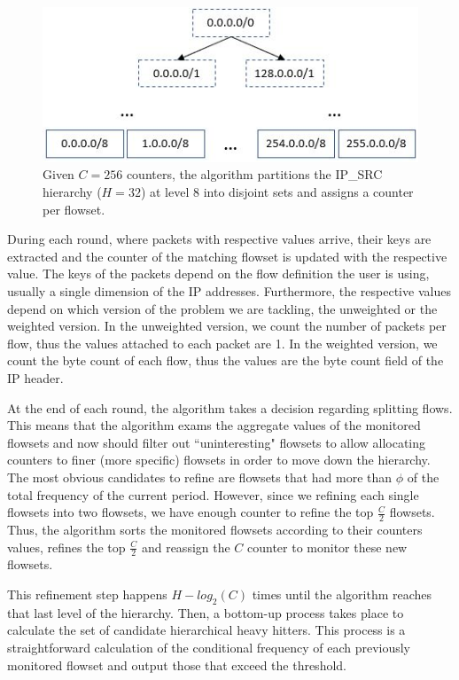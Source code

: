 \begin{figure}
	\centering
  \includegraphics[width=\linewidth]{HHH/jpg_figures/init.JPG}
\caption[An example of partitioning the hierarchy given $256$ counters]{Given $C=256$ counters, the algorithm partitions the IP\_SRC hierarchy ($H=32$) at level $8$ into disjoint sets and assigns a counter per flowset.}
\label{fig:init}
\end{figure}

During each round, where packets with respective values arrive, their keys are extracted and the counter of the matching flowset is updated with the respective value. The keys of the packets depend on the flow definition the user is using, usually a single dimension of the IP addresses.
Furthermore, the respective values depend on which version of the problem we are tackling, the unweighted or the weighted version. In the unweighted version, we count the number of packets per flow, thus the values attached to each packet are 1. In the weighted version, we count the byte count of each flow, thus the values are the byte count field of the IP header.

At the end of each round, the algorithm takes a decision regarding splitting flows. This means that the algorithm exams the aggregate values of the monitored flowsets and now should filter out ``uninteresting" flowsets to allow allocating counters to finer (more specific) flowsets in order to move down the hierarchy. The most obvious candidates to refine are flowsets that had more than $\phi$ of the total frequency of the current period. However, since we refining each single flowsets into two flowsets, we have enough counter to refine the top $\frac{C}{2}$ flowsets. Thus, the algorithm sorts the monitored flowsets according to their counters values, refines the top $\frac{C}{2}$ and reassign the $C$ counter to monitor these new flowsets.

This refinement step happens $H-log_2(C)$ times until the algorithm reaches that last level of the hierarchy. Then, a bottom-up process takes place to calculate the set of candidate hierarchical heavy hitters. This process is a straightforward calculation of the conditional frequency of each previously monitored flowset and output those that exceed the threshold.

